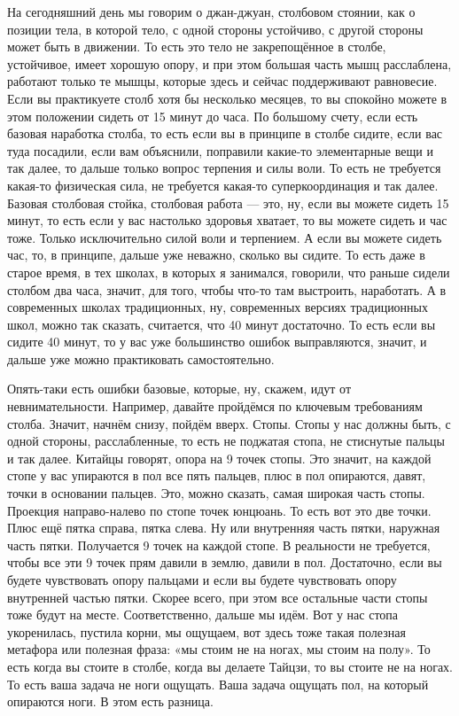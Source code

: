 На сегодняшний день мы 
говорим о джан-джуан, столбовом стоянии, как о позиции тела, в которой тело, с одной стороны 
устойчиво, с другой стороны может быть в движении. То есть это тело не закрепощённое в 
столбе, устойчивое, имеет хорошую опору, и при этом большая часть мышц расслаблена, работают 
только те мышцы, которые здесь и сейчас поддерживают равновесие. Если вы практикуете столб 
хотя бы несколько месяцев, то вы спокойно можете в этом положении сидеть от 15 минут до часа. 
По большому счету, если есть базовая наработка столба, то есть если вы в принципе в столбе 
сидите, если вас туда посадили, если вам объяснили, поправили какие-то элементарные вещи и так
далее, то дальше только вопрос терпения и силы воли. То есть не требуется какая-то физическая 
сила, не требуется какая-то суперкоординация и так далее. Базовая столбовая стойка, 
столбовая работа --- это, ну, если вы можете сидеть 15 минут, то есть если у вас настолько 
здоровья хватает, то вы можете сидеть и час тоже. Только исключительно силой воли и 
терпением. А если вы можете сидеть час, то, в принципе, дальше уже неважно, сколько вы сидите. 
То есть даже в старое время, в тех школах, в которых я занимался, говорили, что раньше сидели 
столбом два часа, значит, для того, чтобы что-то там выстроить, наработать. А в современных 
школах традиционных, ну, современных версиях традиционных школ, можно так сказать, 
считается, что 40 минут достаточно. То есть если вы сидите 40 минут, то у вас уже большинство 
ошибок выправляются, значит, и дальше уже можно практиковать самостоятельно.

Опять-таки 
есть ошибки базовые, которые, ну, скажем, идут от невнимательности. Например, давайте 
пройдёмся по ключевым требованиям столба. Значит, начнём снизу, пойдём вверх. Стопы. Стопы у 
нас должны быть, с одной стороны, расслабленные, то есть не поджатая стопа, не стиснутые 
пальцы и так далее. Китайцы говорят, опора на 9 точек стопы. Это значит, на каждой стопе у вас
упираются в пол все пять пальцев, плюс в пол опираются, давят, точки в основании пальцев. Это, 
можно сказать, самая широкая часть стопы. Проекция направо-налево по стопе точек юнцюань. То 
есть вот это две точки. Плюс ещё пятка справа, пятка слева. Ну или внутренняя часть пятки, 
наружная часть пятки. Получается 9 точек на каждой стопе. В реальности не требуется, чтобы 
все эти 9 точек прям давили в землю, давили в пол. Достаточно, если вы будете чувствовать 
опору пальцами и если вы будете чувствовать опору внутренней частью пятки. Скорее всего, при 
этом все остальные части стопы тоже будут на месте.
Соответственно, дальше мы идём.
Вот у нас стопа укоренилась, пустила корни, мы ощущаем, вот здесь тоже такая полезная 
метафора или полезная фраза: «мы стоим не на ногах, мы стоим на полу». То есть когда вы стоите в 
столбе, когда вы делаете Тайцзи, то вы стоите не на ногах. То есть ваша задача не ноги ощущать. 
Ваша задача ощущать пол, на который опираются ноги. В этом есть разница.

